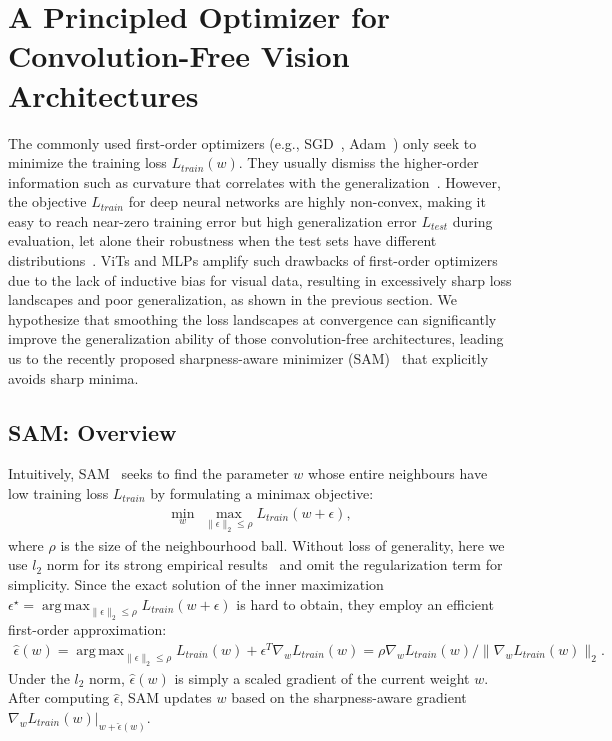 \documentclass{article}
\DeclareMathOperator*{\argmax}{arg\,max}
\begin{document}
\section{A Principled Optimizer for Convolution-Free Vision Architectures}
The commonly used first-order optimizers (e.g., SGD~\cite{Nesterov1983AMF}, Adam~\cite{kingma2017adam}) only seek to minimize the training loss $L_{train}(w)$. 
They usually dismiss the higher-order information such as curvature that correlates with the generalization~\cite{keskar2017largebatch, chaudhari2017entropysgd, dziugaite2017computing}.
However, the objective $L_{train}$ for deep neural networks are highly non-convex, making it easy to reach near-zero training error but high generalization error $L_{test}$ during evaluation, let alone their robustness when the test sets have different distributions~\cite{hendrycks2019benchmarking, hendrycks2020faces}. ViTs and MLPs amplify such drawbacks of first-order optimizers due to the lack of inductive bias for visual data, resulting in excessively sharp loss landscapes and poor generalization, as shown in the previous section.
We hypothesize that smoothing the loss landscapes at convergence can significantly improve the generalization ability of those convolution-free architectures, leading us to the recently proposed sharpness-aware minimizer (SAM)~\cite{foret2021sharpnessaware} that explicitly avoids sharp minima.

\subsection{SAM: Overview}
Intuitively, SAM~\cite{foret2021sharpnessaware} seeks to find the parameter $w$ whose entire neighbours have low training loss $L_{train}$ by formulating a minimax objective:
\begin{align}
    \min_w\ \max_{\|\epsilon\|_2\leq \rho} L_{train}(w+\epsilon),
\end{align}
where $\rho$ is the size of the neighbourhood ball.
Without loss of generality, here we use $l_2$ norm for its strong empirical results~\cite{foret2021sharpnessaware} and omit the regularization term for simplicity. 
Since the exact solution of the inner maximization $\epsilon^\star = \argmax_{\|\epsilon\|_2\leq \rho}L_{train}(w+\epsilon)$ is hard to obtain, they employ an efficient first-order approximation:
\begin{align}
    \hat{\epsilon}(w) = \argmax_{\|\epsilon\|_2\leq\rho}L_{train}(w) + \epsilon^T\nabla_w L_{train}(w)
    = \rho\nabla_wL_{train}(w)/\|\nabla_wL_{train}(w)\|_2.
\end{align}
Under the $l_2$ norm, $\hat{\epsilon}(w)$ is simply a scaled gradient of the current weight $w$.
After computing $\hat{\epsilon}$, SAM updates $w$ based on the sharpness-aware gradient $\nabla_wL_{train}(w)|_{w+\hat{\epsilon}(w)}$.
\end{document}
